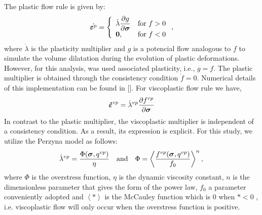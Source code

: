 \documentclass[a4paper,fleqn]{cas-sc}
\begin{document}
The plastic flow rule is given by:
\begin{equation}
	\label{eq_plastic_flow}
	\dot {\boldsymbol{\varepsilon}^{p}} = \left\{ 
	\begin{array}{ll} 
		\dot \lambda \dfrac{\partial g}{\partial \boldsymbol{\sigma}} &  \text{for } f > 0 \\ 
		\boldsymbol 0, & \text{for } f < 0 \\
	\end{array}\right.,
\end{equation}
where $\dot \lambda$ is the plasticity multiplier and $g$ is a potencial flow analogous to $f$ to simulate the volume dilatation during the evolution of plastic deformations. However, for this analysis, was used associated plasticity, i.e., $g=f$. The plastic multiplier is obtained through the consistency condition $\dot f = 0$. Numerical details of this implementation can be found in []. For viscoplastic flow rule we have,
\begin{equation}
	\label{eq_viscoplastic_flow}
	\boldsymbol{\dot{\varepsilon}}^{vp} = \dot \lambda^{vp} \dfrac{\partial f^{vp}}{\partial \boldsymbol{\sigma}}
\end{equation}
In contrast to the plastic multiplier, the viscoplastic multiplier is independent of a consistency condition. As a result, its expression is explicit. For this study, we utilize the Perzyna model as follows:
\begin{equation} \label{eq_perzyna_model}
	\dot \lambda^{vp} = \dfrac{\Phi(\boldsymbol{\sigma},q^{vp})}{\eta}~~~\text{and}~~~\Phi = \left\langle  \dfrac{f^{vp}(\boldsymbol{\sigma},q^{vp})}{f_0} \right\rangle^n, \,
\end{equation} where $\Phi$ is the overstress function, $\eta$ is the dynamic viscosity constant, $n$ is the dimensionless parameter that gives the form of the power law, $f_0$ a parameter conveniently adopted and $\left\langle * \right\rangle$ is the McCauley function which is $0$ when $* <0$ , i.e. viscoplastic flow will only occur when the overstress function is positive.
\end{document}
